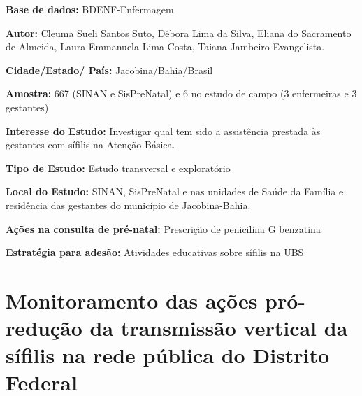 \begin{description}
\item \textbf{Base de dados:} BDENF-Enfermagem
\item \textbf{Autor:} Cleuma Sueli Santos Suto, Débora Lima da Silva, Eliana do Sacramento de Almeida, Laura Emmanuela Lima Costa, Taiana Jambeiro Evangelista.
\item \textbf{Cidade/Estado/ País:} Jacobina/Bahia/Brasil
\item \textbf{Amostra:} 667 (SINAN e SisPreNatal) e 6 no estudo de campo (3 enfermeiras e 3 gestantes)
\item \textbf{Interesse do Estudo:} Investigar qual tem sido a assistência prestada às gestantes com sífilis na Atenção Básica.
\item \textbf{Tipo de Estudo:} Estudo transversal e exploratório
\item \textbf{Local do Estudo:} SINAN, SisPreNatal e nas unidades de Saúde da Família e residência das gestantes do município de Jacobina-Bahia.
\item \textbf{Ações na consulta de pré-natal:} Prescrição de penicilina G benzatina
\item \textbf{Estratégia para adesão:} Atividades educativas sobre sífilis na UBS
\end{description}

\section{Monitoramento das ações pró-redução da transmissão vertical da sífilis na rede pública do Distrito Federal \cite{tavares2012monitoramento}}


